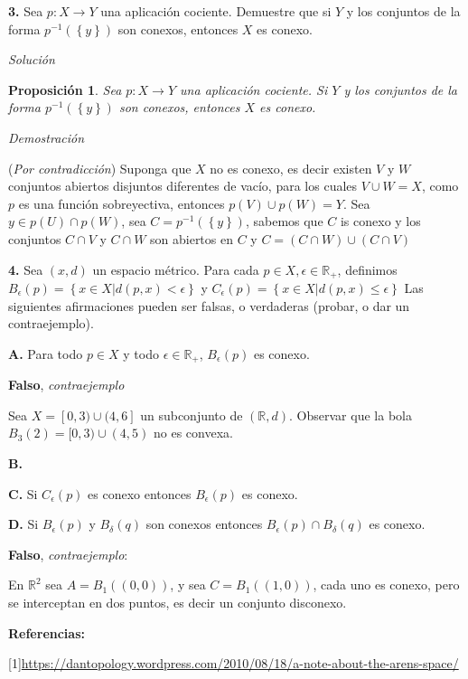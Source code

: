\documentclass[]{article}
\newtheorem{prop}{Proposición}
\newcommand{\set}[1]{\left\lbrace #1 \right\rbrace}
\newcommand{\RR}{\mathbb{R}}
\newcommand{\function}[3]{#1 : #2 \rightarrow #3}
\begin{document}
\textbf{3.} Sea $ \function{p}{X}{Y} $ una aplicación cociente. Demuestre que si $ Y $ y los conjuntos de la forma $ p^{-1}(\set{y}) $ son conexos, entonces $X$ es conexo.


\textit{Solución}

\begin{prop}
	Sea $ \function{p}{X}{Y} $ una aplicación cociente. Si $ Y $ y los conjuntos de la forma $ p^{-1}(\set{y}) $ son conexos, entonces $X$ es conexo.
\end{prop}

\textit{Demostración}

(\emph{Por contradicción}) Suponga que $X$ no es conexo, es decir existen $V$ y $W$ conjuntos abiertos disjuntos diferentes de vacío, para los cuales $ V \cup W = X$, como $p$ es una función sobreyectiva, entonces $ p(V) \cup p(W) = Y $. Sea $ y \in p(U) \cap p(W) $, sea $ C = p^{-1}(\set{y})$, sabemos que $C$ is conexo y los conjuntos $ C\cap V  $ y $  C \cap W $ son abiertos en $C$ y $C = (C \cap W) \cup (C \cap V)$



%

\textbf{4.} Sea $ (x,d) $ un espacio métrico. Para cada $ p \in X, \epsilon \in \RR_+ $, definimos $ B_\epsilon(p) = \set{x \in X | d(p,x) < \epsilon} $ y $ C_\epsilon(p) = \set{x \in X | d(p,x) \leq \epsilon} $ Las siguientes afirmaciones pueden ser falsas, o verdaderas (probar, o dar un contraejemplo).

\textbf{A.} Para todo $ p \in X $ y todo $ \epsilon \in \RR_+ $, $ B_\epsilon(p) $ es conexo.

\textbf{Falso}, \emph{contraejemplo}

Sea $X = [0,3) \cup (4,6]$ un subconjunto de $ (\RR,d) $. Observar que la bola $ B_3(2) = [0,3) \cup (4,5) $ no es convexa.

\textbf{B.}

\textbf{C.} Si $ C_\epsilon (p) $ es conexo entonces $ B_\epsilon (p) $ es conexo.

\textbf{}


\textbf{D.} Si $ B_\epsilon (p) $ y $ B_\delta(q) $ son conexos entonces $ B_\epsilon(p) 
\cap B_\delta(q) $ es conexo.

\textbf{Falso}, \emph{contraejemplo}:

En $ \RR^2 $ sea $A = B_1((0,0)) $, y sea $ C = B_1((1,0)) $, cada uno es conexo, pero se interceptan en dos puntos, es decir un conjunto disconexo.


\textbf{Referencias:}

[1]\url{https://dantopology.wordpress.com/2010/08/18/a-note-about-the-arens-space/}




 
\end{document}
